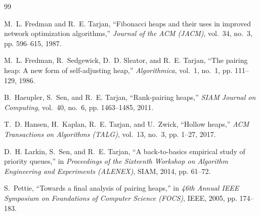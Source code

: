 \documentclass[11pt,a4paper]{article}
\begin{document}
\begin{thebibliography}{99}

M.~L. Fredman and R.~E. Tarjan, ``Fibonacci heaps and their uses in improved network optimization algorithms,'' \emph{Journal of the ACM (JACM)}, vol.~34, no.~3, pp. 596--615, 1987.

M.~L. Fredman, R.~Sedgewick, D.~D. Sleator, and R.~E. Tarjan, ``The pairing heap: A new form of self-adjusting heap,'' \emph{Algorithmica}, vol.~1, no.~1, pp. 111--129, 1986.

B.~Haeupler, S.~Sen, and R.~E. Tarjan, ``Rank-pairing heaps,'' \emph{SIAM Journal on Computing}, vol.~40, no.~6, pp. 1463--1485, 2011.

T.~D. Hansen, H.~Kaplan, R.~E. Tarjan, and U.~Zwick, ``Hollow heaps,'' \emph{ACM Transactions on Algorithms (TALG)}, vol.~13, no.~3, pp. 1--27, 2017.

D.~H. Larkin, S.~Sen, and R.~E. Tarjan, ``A back-to-basics empirical study of priority queues,'' in \emph{Proceedings of the Sixteenth Workshop on Algorithm Engineering and Experiments (ALENEX)}, SIAM, 2014, pp. 61--72.

S.~Pettie, ``Towards a final analysis of pairing heaps,'' in \emph{46th Annual IEEE Symposium on Foundations of Computer Science (FOCS)}, IEEE, 2005, pp. 174--183.

\end{thebibliography}
\end{document}
